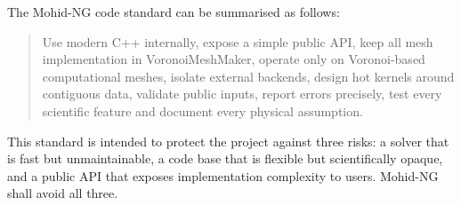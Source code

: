 \documentclass[11pt,a4paper]{article}
\begin{document}
The Mohid-NG code standard can be summarised as follows:

\begin{quote}
Use modern C++ internally, expose a simple public API, keep all mesh implementation in VoronoiMeshMaker, operate only on Voronoi-based computational meshes, isolate external backends, design hot kernels around contiguous data, validate public inputs, report errors precisely, test every scientific feature and document every physical assumption.
\end{quote}

This standard is intended to protect the project against three risks: a solver that is fast but unmaintainable, a code base that is flexible but scientifically opaque, and a public API that exposes implementation complexity to users. Mohid-NG shall avoid all three.
\end{document}
